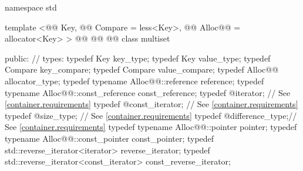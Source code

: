\documentclass[american,twoside]{book}
\begin{document}
\begin{codeblock}
namespace std {
  template <@@ Key, @@ Compare = less<Key>,
            @@ Alloc@@ = allocator<Key> >
  @@
           @@
           @@
  class multiset {
  public:
    // types:
    typedef Key                                   key_type;
    typedef Key                                   value_type;
    typedef Compare                               key_compare;
    typedef Compare                               value_compare;
    typedef Alloc@@                             allocator_type;
    typedef typename Alloc@@::reference         reference;
    typedef typename Alloc@@::const_reference   const_reference;
    typedef @\impdef@                iterator;       // See \ref{container.requirements}
    typedef @\impdef@                const_iterator; // See \ref{container.requirements}
    typedef @\impdef@                size_type;      // See \ref{container.requirements}
    typedef @\impdef@                difference_type;// See \ref{container.requirements}
    typedef typename Alloc@@::pointer           pointer;
    typedef typename Alloc@@::const_pointer     const_pointer;
    typedef std::reverse_iterator<iterator>       reverse_iterator;
    typedef std::reverse_iterator<const_iterator> const_reverse_iterator;

}}
\end{codeblock}
\end{document}
